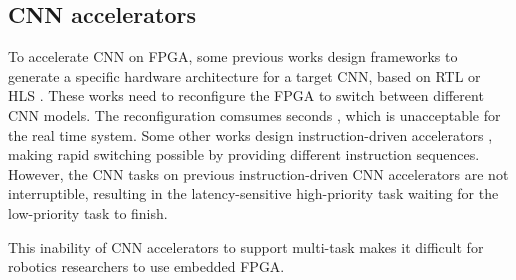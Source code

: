 \subsection{ CNN accelerators }

To accelerate CNN on FPGA, some previous works design frameworks to generate a specific hardware architecture for a target CNN, based on  RTL \cite{li_high_2016} or HLS \cite{lu_evaluating_2017}. These works need to reconfigure the FPGA to switch between different CNN models. The reconfiguration comsumes seconds \cite{FPGAPerformance}, which is unacceptable for the real time system.
Some other works design instruction-driven accelerators \cite{yu2018instruction,qiu2016going,guo2017angel}, making rapid switching possible by providing different instruction sequences. 
However, the CNN tasks on previous instruction-driven CNN accelerators are not interruptible, resulting in the latency-sensitive high-priority task waiting for the low-priority task to finish. 

This inability of CNN accelerators to support multi-task makes it difficult for robotics researchers to use embedded FPGA.

